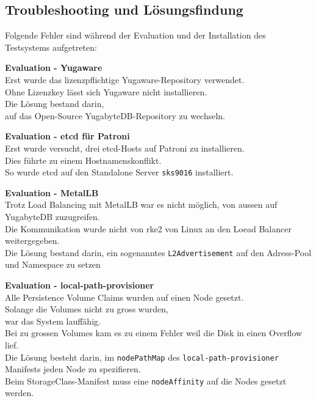 
\begin{flushleft}
    \section{Troubleshooting und Lösungsfindung}
    Folgende Fehler sind während der Evaluation und der Installation des Testsystems aufgetreten:\\
    \begin{description}
        \item \textbf{Evaluation - Yugaware}\hfill \\Erst wurde das lizenzpflichtige Yugaware-Repository verwendet.\\Ohne Lizenzkey lässt sich Yugaware nicht installieren.\\Die Lösung bestand darin,\\auf das Open-Source YugabyteDB-Repository zu wechseln.
        \item \textbf{Evaluation - etcd für Patroni}\hfill \\Erst wurde versucht, drei etcd-Hosts auf Patroni zu installieren.\\Dies führte zu einem Hostnamenskonflikt.\\So wurde etcd auf den Standalone Server \texttt{sks9016} installiert.
        \item \textbf{Evaluation - MetalLB}\hfill \\Trotz Load Balancing mit \Gls{MetalLB} war es nicht möglich, von aussen auf YugabyteDB zuzugreifen.\\Die Kommunikation wurde nicht von \gls{rke2} von Linux an den Loead Balancer weitergegeben.\\Die Lösung bestand darin, ein sogenanntes \texttt{L2Advertisement} auf den Adress-Pool und Namespace zu setzen
        \item \textbf{Evaluation - local-path-provisioner}\hfill \\Alle Persistence Volume Claims wurden auf einen Node gesetzt.\\Solange die Volumes nicht zu gross wurden,\\war das System lauffähig.\\Bei zu grossen Volumes kam es zu einem Fehler weil die Disk in einen Overflow lief.\\Die Lösung besteht darin, im \texttt{nodePathMap} des \texttt{\gls{local-path-provisioner}} Manifests jeden Node zu spezifieren.\\Beim StorageClass-Manifest muss eine \texttt{nodeAffinity} auf die Nodes gesetzt werden.

\end{description}
\end{flushleft}
